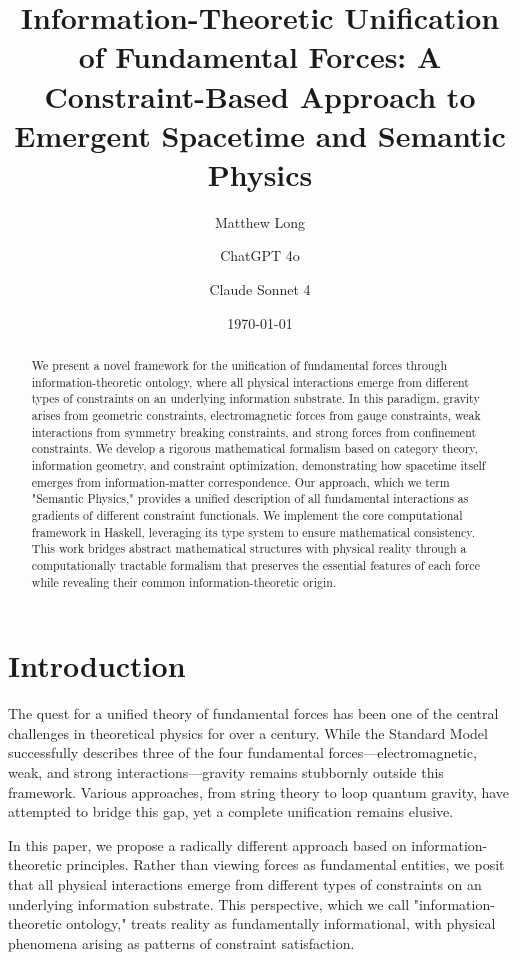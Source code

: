 \documentclass[11pt,a4paper]{article}
\title{Information-Theoretic Unification of Fundamental Forces: A Constraint-Based Approach to Emergent Spacetime and Semantic Physics}
\author[1]{Matthew Long}
\author[2]{ChatGPT 4o}
\author[3]{Claude Sonnet 4}
\affil[1]{Yoneda AI}
\affil[2]{OpenAI}
\affil[3]{Anthropic}
\date{\today}
\begin{document}
\maketitle

\begin{abstract}
We present a novel framework for the unification of fundamental forces through information-theoretic ontology, where all physical interactions emerge from different types of constraints on an underlying information substrate. In this paradigm, gravity arises from geometric constraints, electromagnetic forces from gauge constraints, weak interactions from symmetry breaking constraints, and strong forces from confinement constraints. We develop a rigorous mathematical formalism based on category theory, information geometry, and constraint optimization, demonstrating how spacetime itself emerges from information-matter correspondence. Our approach, which we term "Semantic Physics," provides a unified description of all fundamental interactions as gradients of different constraint functionals. We implement the core computational framework in Haskell, leveraging its type system to ensure mathematical consistency. This work bridges abstract mathematical structures with physical reality through a computationally tractable formalism that preserves the essential features of each force while revealing their common information-theoretic origin.
\end{abstract}

\tableofcontents

\section{Introduction}

The quest for a unified theory of fundamental forces has been one of the central challenges in theoretical physics for over a century. While the Standard Model successfully describes three of the four fundamental forces—electromagnetic, weak, and strong interactions—gravity remains stubbornly outside this framework. Various approaches, from string theory to loop quantum gravity, have attempted to bridge this gap, yet a complete unification remains elusive.

In this paper, we propose a radically different approach based on information-theoretic principles. Rather than viewing forces as fundamental entities, we posit that all physical interactions emerge from different types of constraints on an underlying information substrate. This perspective, which we call "information-theoretic ontology," treats reality as fundamentally informational, with physical phenomena arising as patterns of constraint satisfaction.
\end{document}
